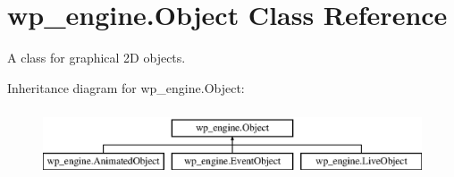\hypertarget{classwp__engine_1_1_object}{\section{wp\-\_\-engine.\-Object Class Reference}
\label{classwp__engine_1_1_object}
}


A class for graphical 2\-D objects.  


Inheritance diagram for wp\-\_\-engine.\-Object\-:\begin{figure}[H]
\begin{center}
\leavevmode
\includegraphics[height=2.000000cm]{classwp__engine_1_1_object}
\end{center}
\end{figure}
